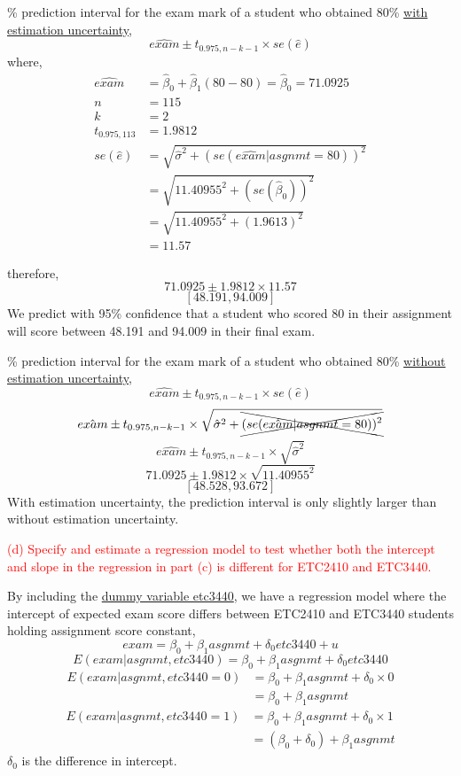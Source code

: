 \documentclass[12pt]{report}
\begin{document}
\newpage
{}\% prediction interval for the exam mark of a student who obtained 80\% \uline{with estimation uncertainty},
$$\widehat{exam} \pm t_{0.975,n-k-1} \times se(\hat{e})$$
\noindent where,
\begin{align*}
	\widehat{exam} &= \hat{\beta}_0 + \hat{\beta}_1(80-80) = \hat{\beta}_0 = 71.0925 \\
	n &= 115 \\
	k &= 2 \\
	t_{0.975,113 }&= 1.9812 \\
	se(\hat{e}) &= \sqrt{\hat{\sigma}^2 + (se(\hat{exam}|asgnmt=80))^2} \\
	&= \sqrt{11.40955^2 + (se(\hat{\beta}_0))^2} \\
	&= \sqrt{11.40955^2 + (1.9613)^2} \\
	&= 11.57
\end{align*}
\begin{figure}[H]
	\centering
\end{figure}
\vspace{-\baselineskip}
\noindent therefore,
$$71.0925 \pm 1.9812 \times 11.57$$
$$[48.191,94.009]$$
\noindent We predict with 95\% confidence that a student who scored 80 in their assignment will score between 48.191 and 94.009 in their final exam.

\newpage
{}\% prediction interval for the exam mark of a student who obtained 80\% \uline{without estimation uncertainty},
$$\hat{exam} \pm t_{0.975,n-k-1} \times se(\hat{e})$$
$$\hat{exam} \pm t_{0.975,n-k-1} \times \sqrt{\hat{\sigma}^2 + \xcancel{(se(\hat{exam}|asgnmt=80))^2}}$$
$$\hat{exam} \pm t_{0.975,n-k-1} \times \sqrt{\hat{\sigma}^2}$$
$$71.0925 \pm 1.9812 \times \sqrt{11.40955^2}$$
$$[48.528,93.672]$$
\noindent With estimation uncertainty, the prediction interval is only slightly larger than without estimation uncertainty.

\newpage
\noindent \textcolor{red}{(d) Specify and estimate a regression model to test whether both the intercept and slope in the regression in part (c) is different for ETC2410 and ETC3440.}

\noindent By including the \uline{dummy variable etc3440}, we have a regression model where the intercept of expected exam score differs between ETC2410 and ETC3440 students holding assignment score constant, $$exam = \beta_0 + \beta_1asgnmt + \delta_0etc3440 + u$$ $$E(exam|asgnmt,etc3440) = \beta_0 + \beta_1asgnmt + \delta_0etc3440$$
\begin{align*}
	E(exam|asgnmt,etc3440=0) &= \beta_0 + \beta_1asgnmt + \delta_0 \times 0 \\
	& = \beta_0 + \beta_1asgnmt
\end{align*}
\begin{align*}
	E(exam|asgnmt,etc3440=1) &= \beta_0 + \beta_1asgnmt + \delta_0 \times 1 \\
	& = (\beta_0 + \delta_0) + \beta_1asgnmt
\end{align*}
\noindent $\delta_0$ is the difference in intercept.
\end{document}
